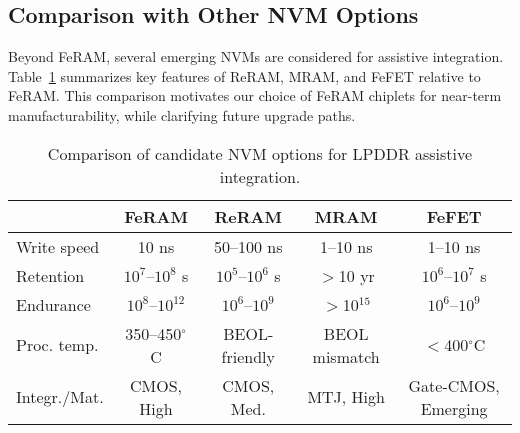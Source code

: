 \subsection{Comparison with Other NVM Options}
Beyond FeRAM, several emerging NVMs are considered for assistive integration.
Table~\ref{tab:nvm_comparison} summarizes key features of ReRAM, MRAM, and FeFET relative to FeRAM.
This comparison motivates our choice of FeRAM chiplets for near-term manufacturability, while clarifying future upgrade paths.

\begin{table}[t]
  \centering
  \caption{Comparison of candidate NVM options for LPDDR assistive integration.}
  \label{tab:nvm_comparison}
  \vspace{2pt}
  \scriptsize %
  \setlength{\tabcolsep}{2pt}
  \begin{tabular}{@{}lcccc@{}}
    \toprule
    & FeRAM & ReRAM & MRAM & FeFET \\
    \midrule
    Write speed & 10 ns & 50--100 ns & 1--10 ns & 1--10 ns \\
    Retention   & $10^7$--$10^8$ s & $10^5$--$10^6$ s & $>$10 yr & $10^6$--$10^7$ s \\
    Endurance   & $10^8$--$10^{12}$ & $10^6$--$10^9$ & $>$10$^{15}$ & $10^6$--$10^9$ \\
    Proc. temp. & 350--450$^\circ$C & BEOL-friendly & BEOL mismatch & $<$400$^\circ$C \\
    Integr./Mat. & CMOS, High & CMOS, Med. & MTJ, High & Gate-CMOS, Emerging \\
    \bottomrule
  \end{tabular}
\end{table}
